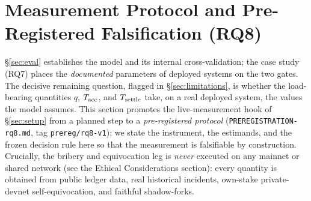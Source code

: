 \section{Measurement Protocol and Pre-Registered Falsification (RQ8)}
\label{sec:measured}

\providecommand{\ArtifactQMaxCosmos}{\,\textit{[pending]}\,}
\providecommand{\ArtifactQMaxCosmosCI}{\,\textit{[pending]}\,}
\providecommand{\ArtifactQMaxN}{\,\textit{[pending]}\,}
\providecommand{\ArtifactTaccCosmosLo}{\,\textit{[pending]}\,}
\providecommand{\ArtifactTaccCosmosHi}{\,\textit{[pending]}\,}
\providecommand{\ArtifactTsettleIBC}{\,\textit{[pending]}\,}
\providecommand{\ArtifactCosmosVerdict}{\textsc{[pending]}}
\providecommand{\ArtifactBridgeTsettle}{\,\textit{[pending]}\,}
\providecommand{\ArtifactBridgePwin}{\,\textit{[pending]}\,}
\providecommand{\ArtifactBridgeVerdict}{\textsc{[pending]}}
\providecommand{\ArtifactCliffCosmos}{\,\textit{[pending]}\,}
\providecommand{\ArtifactPosCtrlMode}{the fast-exit positive control is an in-process \texttt{shadow} rehearsal}
\providecommand{\ArtifactPairedMode}{the paired race is an in-process \texttt{shadow} rehearsal}
\providecommand{\ArtifactRqEightProvenance}{the paired race and the fast-exit positive control are a \emph{rehearsal} on the validated model, \emph{not} a production run against real consensus client code}
\providecommand{\ArtifactRqEightOwed}{the real-client-code re-derivation (the \texttt{rpc} backend on a private two-nodes-one-key localnet), the $\ge 4$-node propagation timing, and a self-run-archive re-derivation of $q_{\max}$}
\providecommand{\ArtifactRqEightRemains}{to replace the in-process rehearsal of the paired race with the real-client-code localnet run}
\providecommand{\ArtifactRowProvenance}{the self-fill and fast-exit rows are the in-process rehearsal of}

\S\ref{sec:eval} establishes the model and its internal cross-validation; the case study
(RQ7) places the \emph{documented} parameters of deployed systems on the two gates. The decisive
remaining question, flagged in \S\ref{sec:limitations}, is whether the load-bearing quantities
$q$, $T_{\mathrm{acc}}$, and $T_{\mathrm{settle}}$ take, on a real deployed system, the values the model assumes. This
section promotes the live-measurement hook of \S\ref{sec:setup} from a planned step to a
\emph{pre-registered protocol} (\texttt{PREREGISTRATION-rq8.md}, tag \texttt{prereg/rq8-v1}); we
state the instrument, the estimands, and the frozen decision rule here so that the measurement is
falsifiable by construction. Crucially, the bribery and equivocation leg is \emph{never} executed
on any mainnet or shared network (see the Ethical Considerations section): every quantity is obtained from public
ledger data, real historical incidents, own-stake private-devnet self-equivocation, and faithful
shadow-forks.

